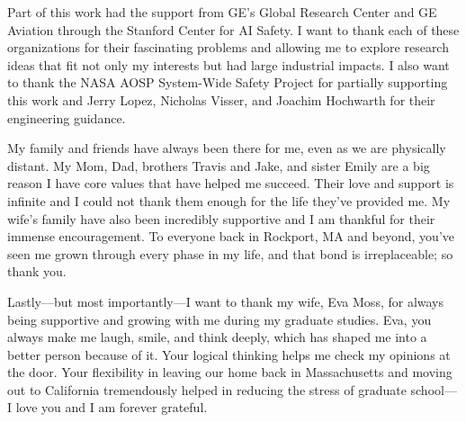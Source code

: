 Part of this work had the support from GE's Global Research Center and GE Aviation through the Stanford Center for AI Safety.
I want to thank each of these organizations for their fascinating problems and allowing me to explore research ideas that fit not only my interests but had large industrial impacts.
I also want to thank the NASA AOSP System-Wide Safety Project for partially supporting this work and Jerry Lopez, Nicholas Visser, and Joachim Hochwarth for their engineering guidance.

My family and friends have always been there for me, even as we are physically distant.
My Mom, Dad, brothers Travis and Jake, and sister Emily are a big reason I have core values that have helped me succeed.
Their love and support is infinite and I could not thank them enough for the life they've provided me.
My wife's family have also been incredibly supportive and I am thankful for their immense encouragement.
To everyone back in Rockport, MA and beyond, you've seen me grown through every phase in my life, and that bond is irreplaceable; so thank you.

Lastly---but most importantly---I want to thank my wife, Eva Moss, for always being supportive and growing with me during my graduate studies.
Eva, you always make me laugh, smile, and think deeply, which has shaped me into a better person because of it.
Your logical thinking helps me check my opinions at the door.
Your flexibility in leaving our home back in Massachusetts and moving out to California tremendously helped in reducing the stress of graduate school---I love you and I am forever grateful.
